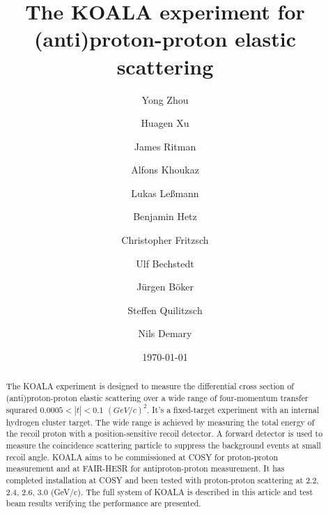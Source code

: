 \documentclass[number]{elsarticle}
\begin{document}
\begin{frontmatter}	
  \title{The KOALA experiment for (anti)proton-proton elastic scattering}
  \date{\today}

  \author[ikp]{Yong Zhou}
  \author[ikp]{Huagen Xu}
  \author[ikp,bochum]{James Ritman}

  \author[muenster]{Alfons Khoukaz}
  \author[muenster]{Lukas Leßmann}
  \author[muenster]{Benjamin Hetz}
  \author[muenster]{Christopher Fritzsch}

  \author[ikp]{Ulf Bechstedt}
  \author[ikp]{Jürgen Böker}
  \author[ikp]{Steffen Quilitzsch}
  \author[ikp]{Nils Demary}





  \address[ikp]{Institut für Kernphysik, Forschungszentrum Jülich, Jülich, 52425, Germany}
  \address[muenster]{Institut für Kernphysik, Universität Münster, Münster, 48149, Germany}
  \address[zea]{Zentralinstitut für Engineering, Elektronik und Analytik, Forschungszentrum Jülich, Jülich, 52425, Germany}
  \address[bochum]{Ruhr-Universität Bochum, Bochum, 44780, Germany}


  \begin{abstract}


    The KOALA experiment is designed to measure the differential cross section
    of (anti)proton-proton elastic scattering over a wide range of four-momentum
    transfer squrared $0.0005 < |t| < 0.1$ $(GeV/c)^2$.
    It's a fixed-target experiment with an internal hydrogen cluster target.
    The wide range is achieved by measuring the total energy of the recoil proton with a
    position-sensitive recoil detector.
    A forward detector is used to measure the coincidence scattering particle to
    suppress the background events at small recoil angle.
    KOALA aims to be commissioned at COSY for proton-proton measurement and at
    FAIR-HESR for antiproton-proton measurement.
    It has completed installation at COSY and been tested with proton-proton
    scattering at 2.2, 2.4, 2.6, 3.0 (GeV/c).
    The full system of KOALA is described in this article and test beam results
    verifying the performance are presented.


\end{abstract}
\end{frontmatter}
\end{document}
